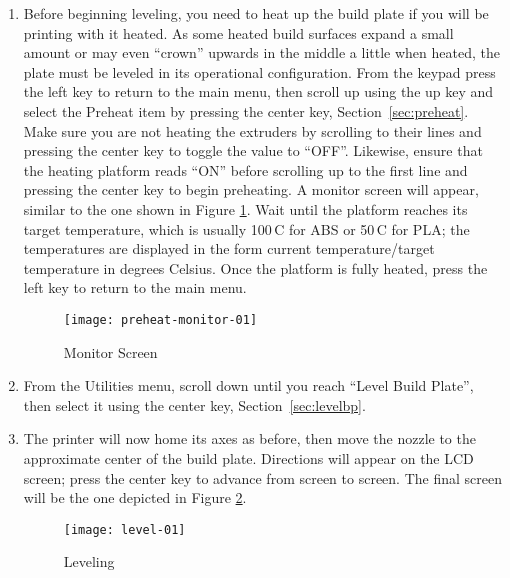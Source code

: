\begin{enumerate}
\item Before beginning leveling, you need to heat up the build plate if you will be printing with it heated.  As some heated build surfaces expand a small amount or may even ``crown'' upwards in the middle a little when heated, the plate must be leveled in its operational configuration.  From the keypad press the left key to return to the main menu, then scroll up using the up key and select the Preheat item by pressing the center key, Section~\ref{sec:preheat}.  Make sure you are not heating the extruders by scrolling to their lines and pressing the center key to toggle the value to ``OFF''.  Likewise, ensure that the heating platform reads ``ON'' before scrolling up to the first line and pressing the center key to begin preheating.  A monitor screen will appear, similar to the one shown in Figure \ref{fig:tempform}.  Wait until the platform reaches its target temperature, which is usually 100\textdegree\,C for ABS or 50\textdegree\,C for PLA; the temperatures are displayed in the form current temperature/target temperature in degrees Celsius.  Once the platform is fully heated, press the left key to return to the main menu.

\begin{figure}[!htbp]
  \centering
    \texttt{[image: preheat-monitor-01]}
    \caption{Monitor Screen}
  \label{fig:tempform}
\end{figure}

\item From the Utilities menu, scroll down until you reach ``Level Build Plate'', then select it using the center key, Section~\ref{sec:levelbp}.
\item The printer will now home its axes as before, then move the nozzle to the approximate center of the build plate.  Directions will appear on the LCD screen; press the center key to advance from screen to screen.  The final screen will be the one depicted in Figure \ref{fig:level-01}.

\begin{figure}[!htbp]
  \centering
    \texttt{[image: level-01]}
    \caption{Leveling}
  \label{fig:level-01}
\end{figure}


\end{enumerate}
